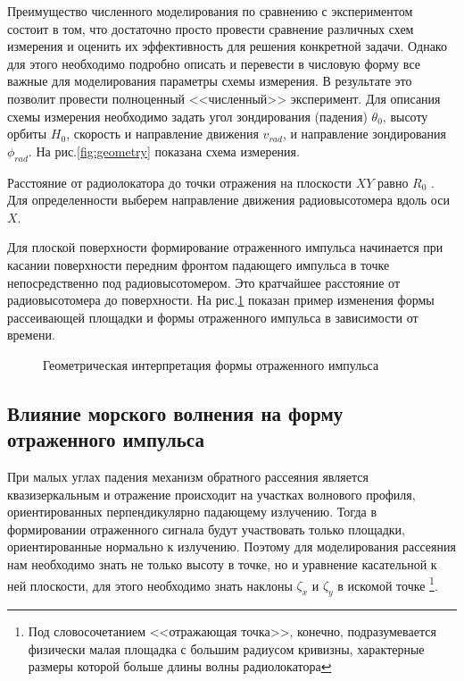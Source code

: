 Преимущество численного моделирования по сравнению с экспериментом состоит в
том, что достаточно просто провести сравнение различных схем измерения и
оценить их эффективность для решения конкретной задачи. Однако для этого
необходимо подробно описать и перевести в числовую форму все важные для
моделирования параметры схемы измерения. В результате это позволит провести
полноценный <<численный>> эксперимент.  Для описания схемы измерения необходимо
задать угол зондирования (падения) $\theta_0$, высоту орбиты $H_0$, скорость и
направление движения $v_{rad}$, и направление зондирования $\phi_{rad}$. На рис.\ref{fig:geometry} показана схема измерения. 

Расстояние от радиолокатора до точки отражения на плоскости $XY$ равно $R_0$ .
Для определенности выберем направление движения радиовысотомера вдоль оси $X$.


Для плоской поверхности формирование отраженного импульса начинается при
касании поверхности передним фронтом падающего импульса в точке непосредственно
под радиовысотомером. Это кратчайшее расстояние от радиовысотомера до
поверхности. На рис.\ref{fig:wave_form} показан пример изменения формы
рассеивающей площадки и формы отраженного импульса в зависимости от времени.

\begin{figure}[h]
    \centering
    \hfill
    \begin{subfigure}{0.25\linewidth}
        \centering
        
    \end{subfigure}
    \hfill
    \begin{subfigure}{0.25\linewidth}
        \centering
        
    \end{subfigure}
    \hfill
    \begin{subfigure}{0.25\linewidth}
        \centering
        
    \end{subfigure}
    \label{fig:wave_form}
    \caption{Геометрическая интерпретация формы отраженного импульса}
\end{figure}
\subsection{Влияние морского волнения на форму отраженного импульса}%
\label{sub:vliianie_morskogo_volneniia_na_vormu_otrazhennogo_impul_sa}


При малых углах падения механизм обратного  рассеяния является квазизеркальным
и отражение происходит на участках волнового профиля, ориентированных
перпендикулярно падающему излучению. Тогда в формировании отраженного сигнала
будут участвовать только площадки, ориентированные нормально к излучению. 
Поэтому для моделирования рассеяния нам необходимо знать не только высоту в
точке, но и уравнение касательной к ней плоскости, для этого необходимо знать
наклоны $\zeta_x$ и  $\zeta_y$ в искомой точке
\footnote{Под словосочетанием <<отражающая точка>>, конечно, подразумевается
    физически малая площадка с большим радиусом кривизны, характерные размеры  которой больше длины волны
радиолокатора}. 

